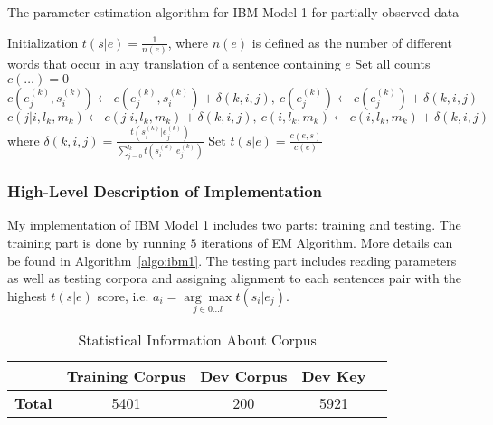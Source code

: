 \begin{algorithm*}[ht]
  \caption{The parameter estimation algorithm for IBM Model 1 for partially-observed data}
  \label{algo:ibm1}
  Initialization $t(s|e)=\frac{1}{n(e)}$, where $n(e)$ is defined as the number of different words that occur in any translation of a sentence containing $e$\;
  {
    Set all counts $c(\dots)=0$\;
    {
        {
            {
                $c\left(e_{j}^{(k)}, s_{i}^{(k)}\right) \leftarrow c\left(e_{j}^{(k)}, s_{i}^{(k)}\right)+\delta(k, i, j), \ c\left(e_{j}^{(k)}\right)\leftarrow c\left(e_{j}^{(k)}\right)+\delta(k, i, j)$\;
                $c\left(j | i, l_{k}, m_{k}\right) \leftarrow c\left(j | i, l_{k}, m_{k}\right)+\delta(k, i, j), \ c\left(i, l_{k}, m_{k}\right) \leftarrow c\left(i, l_{k}, m_{k}\right)+\delta(k, i, j)$\;
                where $\delta(k, i, j)=\frac{t\left(s_{i}^{(k)} | e_{j}^{(k)}\right)}{\sum_{j=0}^{l_{k}} t\left(s_{i}^{(k)} | e_{j}^{(k)}\right)}$
            }
        }
    }
    Set $t(s | e)=\frac{c(e, s)}{c(e)}$\;
  }
\end{algorithm*}

\subsubsection{\textbf{High-Level Description of Implementation}}

My implementation of IBM Model 1 includes two parts: training and testing. The training part is done by running $5$ iterations of EM Algorithm. More details can be found in Algorithm~\ref{algo:ibm1}. The testing part includes reading parameters as well as testing corpora and assigning alignment to each sentences pair with the highest $t(s|e)$ score, i.e. $a_{i}=\underset{j \in 0 \ldots l}{\arg \max } t\left(s_{i} | e_{j}\right)$.

\begin{table}[ht]  %
\centering  %
\caption{Statistical Information About Corpus}
\begin{tabular}{lcccc}
\hline
&    \textbf{Training Corpus} & \textbf{Dev Corpus} & \textbf{Dev Key} \\
\hline
 \textbf{Total} & 5401 & 200 & 5921 \\
\hline
\end{tabular}
\label{tab:stat}
\end{table}

